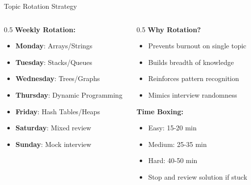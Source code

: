 \documentclass[aspectratio=169,xcolor=dvipsnames]{beamer}
\begin{document}
\begin{frame}{Topic Rotation Strategy}
  \begin{columns}
    \begin{column}{0.5\textwidth}
      \textbf{Weekly Rotation:}
      \begin{itemize}
        \item \textbf{Monday}: Arrays/Strings
        \item \textbf{Tuesday}: Stacks/Queues
        \item \textbf{Wednesday}: Trees/Graphs
        \item \textbf{Thursday}: Dynamic Programming
        \item \textbf{Friday}: Hash Tables/Heaps
        \item \textbf{Saturday}: Mixed review
        \item \textbf{Sunday}: Mock interview
      \end{itemize}
    \end{column}

    \begin{column}{0.5\textwidth}
      \textbf{Why Rotation?}
      \begin{itemize}
        \item Prevents burnout on single topic
        \item Builds breadth of knowledge
        \item Reinforces pattern recognition
        \item Mimics interview randomness
      \end{itemize}

      \vspace{0.3cm}
      \textbf{Time Boxing:}
      \begin{itemize}
        \item Easy: 15-20 min
        \item Medium: 25-35 min
        \item Hard: 40-50 min
        \item Stop and review solution if stuck
      \end{itemize}
    \end{column}
  \end{columns}
\end{frame}
\end{document}

